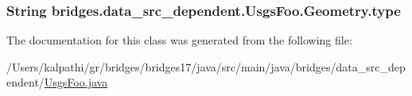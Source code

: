 \subsubsection[{type}]{\setlength{\rightskip}{0pt plus 5cm}String bridges.\+data\+\_\+src\+\_\+dependent.\+Usgs\+Foo.\+Geometry.\+type}\label{classbridges_1_1data__src__dependent_1_1_usgs_foo_1_1_geometry_a985b3a46dad2fcd4e798d2f51198bcfd}


The documentation for this class was generated from the following file\+:\begin{DoxyCompactItemize}
\item 
/\+Users/kalpathi/gr/bridges/bridges17/java/src/main/java/bridges/data\+\_\+src\+\_\+dependent/\hyperlink{_usgs_foo_8java}{Usgs\+Foo.\+java}\end{DoxyCompactItemize}
